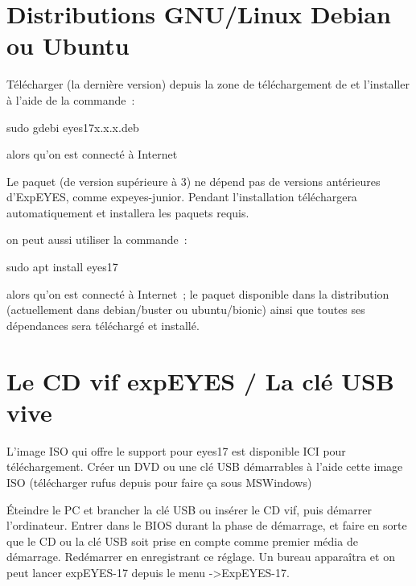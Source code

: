 \documentclass[a4paper,12pt,french]{sphinxmanual}
\begin{document}
\section{Distributions GNU/Linux Debian ou Ubuntu}
\label{\detokenize{1.3:distributions-gnu-linux-debian-ou-ubuntu}}
Télécharger  (la dernière version) depuis
la zone de téléchargement de  et l’installer
à l’aide de la commande :

\begin{sphinxVerbatim}[commandchars=\\\{\}]
\PYGZdl{} sudo gdebi eyes17\PYGZhy{}x.x.x.deb
\end{sphinxVerbatim}

alors qu’on est connecté à Internet

Le paquet  (de version supérieure à 3) ne dépend
pas de versions antérieures d’ExpEYES, comme expeyes-junior. Pendant
l’installation  téléchargera automatiquement et installera
les paquets requis.

 on peut aussi utiliser la commande :

\begin{sphinxVerbatim}[commandchars=\\\{\}]
\PYGZdl{} sudo apt install eyes17
\end{sphinxVerbatim}

alors qu’on est connecté à Internet ; le paquet  disponible
dans la distribution (actuellement dans debian/buster ou ubuntu/bionic)
ainsi que toutes ses dépendances sera téléchargé et installé.


\section{Le CD vif expEYES / La clé USB vive}
\label{\detokenize{1.3:le-cd-vif-expeyes-la-cle-usb-vive}}
L’image ISO qui offre le support pour eyes17 est disponible ICI pour
téléchargement. Créer un DVD ou une clé USB démarrables à l’aide cette
image ISO (télécharger rufus depuis  pour faire
ça sous MSWindows)

Éteindre le PC et brancher la clé USB ou insérer le CD vif, puis démarrer
l’ordinateur. Entrer dans le BIOS durant la phase de démarrage, et
faire en sorte que le CD ou la clé USB soit prise en compte comme
premier média de démarrage. Redémarrer en enregistrant ce réglage.
Un bureau apparaîtra et on peut lancer expEYES-17 depuis le menu -\textgreater{}ExpEYES-17.
\end{document}
